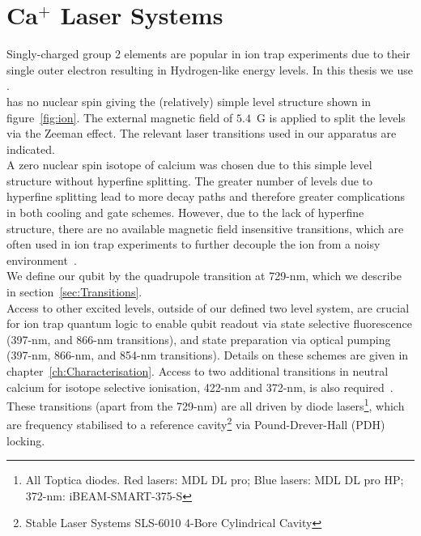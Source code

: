 \section{Ca$^+$ Laser Systems}	
\label{sec:Laser systems}

    Singly-charged group 2 elements are popular in ion trap
    experiments due to their single outer electron resulting in Hydrogen-like
    energy levels. In this thesis we use \ca.\\
    \ca has
    no nuclear spin giving the
    (relatively) simple level structure shown in figure~\ref{fig:ion}. The external
    magnetic field of $5.4$~G is applied to split the levels via the Zeeman
    effect. The relevant laser transitions used in our apparatus are indicated.\\
    A zero nuclear spin isotope of calcium was chosen due to this simple level
    structure without hyperfine splitting. The greater number of levels due to
    hyperfine splitting lead to more decay paths and therefore greater
    complications in both cooling and gate schemes. However, due to the lack of hyperfine structure, there are no available magnetic field insensitive transitions, which are
    often used in ion trap experiments to further decouple the ion from a noisy
    environment~\cite{brewer201927al}. \\
    We define our qubit by the quadrupole transition at 729-nm, which we describe in section~\ref{sec:Transitions}.\\
    Access to other excited levels, outside of our defined two level system, are crucial for ion trap quantum logic to enable qubit readout via state selective fluorescence (397-nm, and 866-nm transitions), and state preparation via optical pumping (397-nm, 866-nm, and 854-nm transitions). Details on these schemes are given in chapter~\ref{ch:Characterisation}. Access to two additional transitions in neutral calcium for isotope selective ionisation, 422-nm and 372-nm, is also required~\cite{lucas2004isotope-selective}.\\
    These transitions (apart from the 729-nm) are all driven by diode lasers\footnote{All Toptica diodes. Red lasers: MDL DL pro; Blue lasers: MDL DL pro HP; 372-nm: iBEAM-SMART-375-S}, which are frequency stabilised to a reference cavity\footnote{Stable Laser Systems SLS-6010 4-Bore Cylindrical Cavity} via Pound-Drever-Hall (PDH) locking. 
